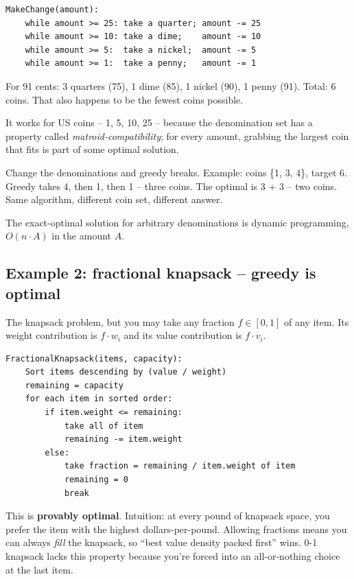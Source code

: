 \documentclass[11pt]{article}
\begin{document}
\begin{examplebox}
\begin{verbatim}
MakeChange(amount):
    while amount >= 25: take a quarter; amount -= 25
    while amount >= 10: take a dime;    amount -= 10
    while amount >= 5:  take a nickel;  amount -= 5
    while amount >= 1:  take a penny;   amount -= 1
\end{verbatim}
For 91 cents: 3 quarters (75), 1 dime (85), 1 nickel (90), 1 penny
(91). Total: 6 coins. That also happens to be the fewest coins
possible.
\end{examplebox}

\begin{warnbox}
It works for US coins -- 1, 5, 10, 25 -- because the denomination set
has a property called \emph{matroid-compatibility}; for every amount,
grabbing the largest coin that fits is part of some optimal solution.

Change the denominations and greedy breaks. Example: coins
\{1, 3, 4\}, target 6. Greedy takes 4, then 1, then 1 -- three coins.
The optimal is 3 + 3 -- two coins. Same algorithm, different coin
set, different answer.

The exact-optimal solution for arbitrary denominations is dynamic
programming, $O(n \cdot A)$ in the amount $A$.
\end{warnbox}

\subsection{Example 2: fractional knapsack -- greedy is optimal}

\begin{defnbox}
The knapsack problem, but you may take any fraction $f \in [0, 1]$
of any item. Its weight contribution is $f \cdot w_i$ and its value
contribution is $f \cdot v_i$.
\end{defnbox}

\begin{examplebox}
\begin{verbatim}
FractionalKnapsack(items, capacity):
    Sort items descending by (value / weight)
    remaining = capacity
    for each item in sorted order:
        if item.weight <= remaining:
            take all of item
            remaining -= item.weight
        else:
            take fraction = remaining / item.weight of item
            remaining = 0
            break
\end{verbatim}
This is \textbf{provably optimal}. Intuition: at every pound of
knapsack space, you prefer the item with the highest
dollars-per-pound. Allowing fractions means you can always
\emph{fill} the knapsack, so ``best value density packed first'' wins.
0-1 knapsack lacks this property because you're forced into an
all-or-nothing choice at the last item.
\end{examplebox}
\end{document}
